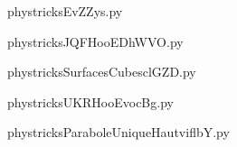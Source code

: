     

    \clearpage
    


    \newcommand{\CaptionFigEvZZys}{<+Type your caption here+>}
    \begin{center}
        
    \end{center}
    phystricksEvZZys.py

    

    \clearpage
    


    \newcommand{\CaptionFigJQFHooEDhWVO}{<+Type your caption here+>}
    \begin{center}
        
    \end{center}
    phystricksJQFHooEDhWVO.py

    

    \clearpage
    


    \newcommand{\CaptionFigSurfacesCubesclGZD}{<+Type your caption here+>}
    \begin{center}
        
    \end{center}
    phystricksSurfacesCubesclGZD.py

    

    \clearpage
    


    \newcommand{\CaptionFigUKRHooEvocBg}{<+Type your caption here+>}
    \begin{center}
        
    \end{center}
    phystricksUKRHooEvocBg.py

    

    \clearpage
    


    \newcommand{\CaptionFigParaboleUniqueHautviflbY}{<+Type your caption here+>}
    \begin{center}
        
    \end{center}
    phystricksParaboleUniqueHautviflbY.py

    

    \clearpage
    

